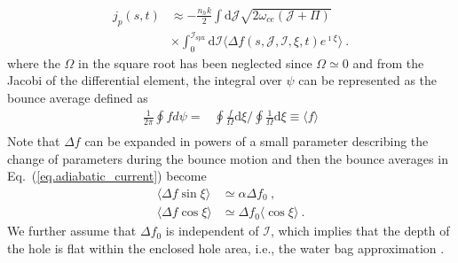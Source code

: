 \begin{equation}\label{eq.adiabatic_current}
\begin{aligned}
    j_p(s,t)  &\approx -  \frac{n_h k}{2} \int\mathrm{d} \mathcal{J}  \sqrt{2\omega_{ce} (\mathcal{J} + \Pi)} \\
    & \times 
    \int_0^{\mathcal{I}_{\mathrm{s p x}}}\mathrm{d}\mathcal{I}  \langle \Delta f(s,\mathcal{J},\mathcal{I},\xi,t)e^{\imath \xi} \rangle  ~.
\end{aligned}
\end{equation}
where 
the $\Omega$ in the square root has been  neglected since $\Omega \simeq 0$
and 
from the Jacobi of the differential element, the integral over $\psi$ can be represented as the bounce average defined as 
\cite{berk1999}
\begin{equation}
    \begin{aligned}
       \frac{1}{2\pi}\oint f d\psi = & \oint \frac{ f }{\Omega}\mathrm{d}\xi \bigg/ \oint \frac{1}{\Omega} \mathrm{d} \xi   \equiv\langle f \rangle 
      \\
    \end{aligned}
\end{equation}
Note that $\Delta f$ can be expanded in powers of  a small parameter describing the change of parameters during the bounce motion and then the bounce averages in Eq.~(\ref{eq.adiabatic_current}) become 
 \cite{berk1999} 
\begin{equation}
    \begin{aligned}
    \langle\Delta f \sin \xi \rangle &\simeq \alpha \Delta f_0 ~, \\ 
    \langle \Delta f \cos \xi \rangle &\simeq  \Delta f_0 \langle \cos \xi \rangle ~.
    \end{aligned}
\end{equation}
We further assume that $\Delta f_0$ is independent of $\mathcal{I}$, which implies that the depth of the hole is flat within the enclosed hole area, i.e., the water bag approximation \cite{omura_theory_2008,hezaveh2021}. 
